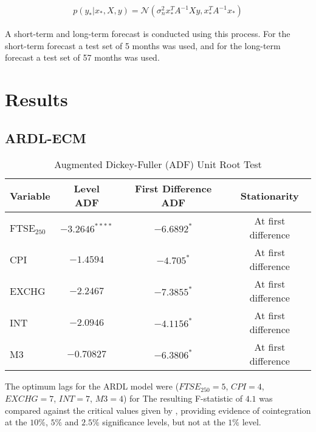 \documentclass[11pt,a4paper]{article}
\newcommand{\citeboth}[1]{\citeauthor{#1} \citep{#1}}
\begin{document}
\begin{enumerate}
    \begin{align}
        p(y_{*}|x_{*}, X, y) = \mathcal{N}(\sigma_{n}^{2} x_{*}^{T}A^{-1}Xy, x_{*}^{T}A^{-1}x_{*}) \label{eq: testw}
    \end{align}
\end{enumerate}

A short-term and long-term forecast is conducted using this process. For the short-term forecast a test set of 5 months was used, and for the long-term forecast a test set of 57 months was used.


\section{Results}
\label{sec: results}

\subsection{ARDL-ECM}

\begin{table}[h!]
    \centering
    \caption{Augmented Dickey-Fuller (ADF) Unit Root Test}
    \begin{tabular}{lccc}
        \toprule
        \textbf{Variable} & \textbf{Level ADF} & \textbf{First Difference ADF} & \textbf{Stationarity} \\
        \midrule
        FTSE$_{250}$ & $-3.2646^{****}$ & $-6.6892^{*}$ & At first difference \\
        CPI          & $-1.4594$ & $-4.705^{*}$ & At first difference \\
        EXCHG        & $-2.2467$ & $-7.3855^{*}$ & At first difference \\
        INT          & $-2.0946$ & $-4.1156^{*}$ & At first difference \\
        M3           & $-0.70827$ & $-6.3806^{*}$ & At first difference \\
        \bottomrule
    \end{tabular}
\end{table}


The optimum lags for the ARDL model were ($FTSE_{250} = 5$, $CPI = 4$, $EXCHG=7$, $INT =7$, $M3=4$) for  The resulting F-statistic of $4.1$ was compared against the critical values
given by \citeboth{pesaran2001}, providing evidence of cointegration 
at the $10\%$, $5\%$ and $2.5\%$ significance levels, but not at the $1\%$ 
level.
\end{document}
